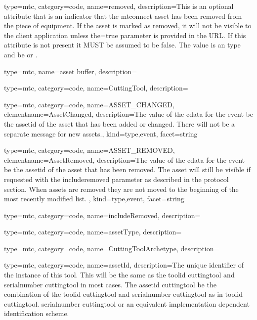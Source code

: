 {
  type=mtc,
  category=code,
  name={removed},
  description={This is an optional attribute that is an indicator that the \gls{mtconnect asset} has been removed from the piece of equipment. If the \gls{asset} is marked as removed,
  it will not be visible to the client application unless the=true parameter is provided in the URL. If this attribute is not present it MUST be assumed to be false. The value is an  type and \MUST be  or .}
}


{
  type=mtc,
  name={asset buffer},
  description={}
}


{
  type=mtc,
  category=code,
  name={CuttingTool},
  description={}
}


{
  type=mtc,
  category=code,
  name={ASSET\_CHANGED},
  elementname={AssetChanged},
  description={The value of the \gls{cdata} for the event \MUST be the \gls{assetid} of the asset that has been added or changed. There will not be a separate message for new assets.},
  kind={type,event},
  facet={\gls{string}}
}


{
  type=mtc,
  category=code,
  name={ASSET\_REMOVED},
  elementname={AssetRemoved},
  description={The value of the \gls{cdata} for the event \MUST be the \gls{assetid} of the asset that has been removed. The asset will still be visible if requested with the \gls{includeremoved} parameter as described in the protocol section. When assets are removed they are not moved to the beginning of the most recently modified list. },
  kind={type,event},
  facet={\gls{string}}
}


{
  type=mtc,
  category=code,
  name={includeRemoved},
  description={}
}


{
  type=mtc,
  category=code,
  name={assetType},
  description={}
}


{
  type=mtc,
  category=code,
  name={CuttingToolArchetype},
  description={}
}


{
  type=mtc,
  category=code,
  name={assetId},
  description={The unique identifier of the instance of this tool. This will be the same as the \gls{toolid cuttingtool} and \gls{serialnumber cuttingtool} in most cases. The \gls{assetid cuttingtool} \SHOULD be the combination of the \gls{toolid cuttingtool} and \gls{serialnumber cuttingtool} as in \gls{toolid cuttingtool}. \gls{serialnumber cuttingtool} or an equivalent implementation dependent identification scheme.}
}


